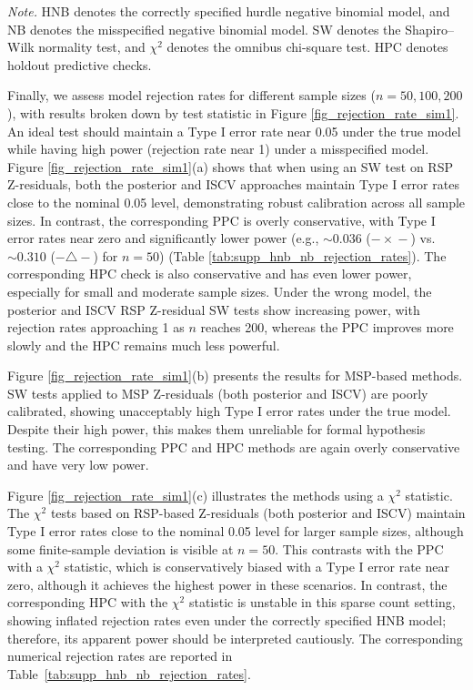 \documentclass[
  12pt]{article}
\theoremstyle{plain}
\theoremstyle{definition}
\theoremstyle{remark}
\begin{document}
\begin{table}[!htbp]
\vspace{1mm}
\begin{minipage}{0.95\textwidth}
\footnotesize
\textit{Note.} HNB denotes the correctly specified hurdle negative binomial model,
and NB denotes the misspecified negative binomial model. SW denotes the
Shapiro--Wilk normality test, and $\chi^2$ denotes the omnibus chi-square test.
HPC denotes holdout predictive checks.
\end{minipage}
\end{table}

Finally, we assess model rejection rates for different sample sizes ($n=50, 100, 200$), with results broken down by test statistic in Figure \ref{fig_rejection_rate_sim1}. An ideal test should maintain a Type I error rate near 0.05 under the true model while having high power (rejection rate near 1) under a misspecified model. Figure \ref{fig_rejection_rate_sim1}(a) shows that when using an SW test on RSP Z-residuals, both the posterior and ISCV approaches maintain Type I error rates close to the nominal 0.05 level, demonstrating robust calibration across all sample sizes. In contrast, the corresponding PPC is overly conservative, with Type I error rates near zero and significantly lower power (e.g., $\sim 0.036$ ($-\!\times\!-$) vs. $\sim 0.310$ ($-\!\triangle\!-$) for $n=50$) (Table \ref{tab:supp_hnb_nb_rejection_rates}). The corresponding HPC check is also conservative and has even lower power, especially for small and moderate sample sizes. Under the wrong model, the posterior and ISCV RSP Z-residual SW tests show increasing power, with rejection rates approaching 1 as $n$ reaches 200, whereas the PPC improves more slowly and the HPC remains much less powerful.

Figure \ref{fig_rejection_rate_sim1}(b) presents the results for MSP-based methods. SW tests applied to MSP Z-residuals (both posterior and ISCV) are poorly calibrated, showing unacceptably high Type I error rates under the true model. Despite their high power, this makes them unreliable for formal hypothesis testing. The corresponding PPC and HPC methods are again overly conservative and have very low power.

Figure \ref{fig_rejection_rate_sim1}(c) illustrates the methods using a $\chi^2$ statistic. The $\chi^2$ tests based on RSP-based Z-residuals (both posterior and ISCV) maintain Type I error rates close to the nominal 0.05 level for larger sample sizes, although some finite-sample deviation is visible at $n=50$. This contrasts with the PPC with a $\chi^2$ statistic, which is conservatively biased with a Type I error rate near zero, although it achieves the highest power in these scenarios. In contrast, the corresponding HPC with the $\chi^2$ statistic is unstable in this sparse count setting, showing inflated rejection rates even under the correctly specified HNB model; therefore, its apparent power should be interpreted cautiously. The corresponding numerical rejection rates are reported in Table~\ref{tab:supp_hnb_nb_rejection_rates}.
\end{document}
